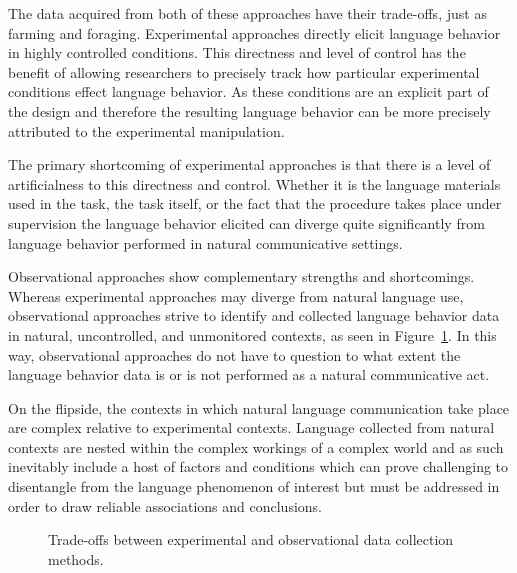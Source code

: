 \documentclass[
  letterpaper,
]{latex/krantz}
\theoremstyle{definition}
\theoremstyle{remark}
\begin{document}
The data acquired from both of these approaches have their trade-offs,
just as farming and foraging. Experimental approaches directly elicit
language behavior in highly controlled conditions. This directness and
level of control has the benefit of allowing researchers to precisely
track how particular experimental conditions effect language behavior.
As these conditions are an explicit part of the design and therefore the
resulting language behavior can be more precisely attributed to the
experimental manipulation.

The primary shortcoming of experimental approaches is that there is a
level of artificialness to this directness and control. Whether it is
the language materials used in the task, the task itself, or the fact
that the procedure takes place under supervision the language behavior
elicited can diverge quite significantly from language behavior
performed in natural communicative settings.

Observational approaches show complementary strengths and shortcomings.
Whereas experimental approaches may diverge from natural language use,
observational approaches strive to identify and collected language
behavior data in natural, uncontrolled, and unmonitored contexts, as
seen in Figure~\ref{fig-data-collection-methods}. In this way,
observational approaches do not have to question to what extent the
language behavior data is or is not performed as a natural communicative
act.

On the flipside, the contexts in which natural language communication
take place are complex relative to experimental contexts. Language
collected from natural contexts are nested within the complex workings
of a complex world and as such inevitably include a host of factors and
conditions which can prove challenging to disentangle from the language
phenomenon of interest but must be addressed in order to draw reliable
associations and conclusions.

\begin{figure}[H]


\caption{\label{fig-data-collection-methods}Trade-offs between
experimental and observational data collection methods.}

\end{figure}%
\end{document}

